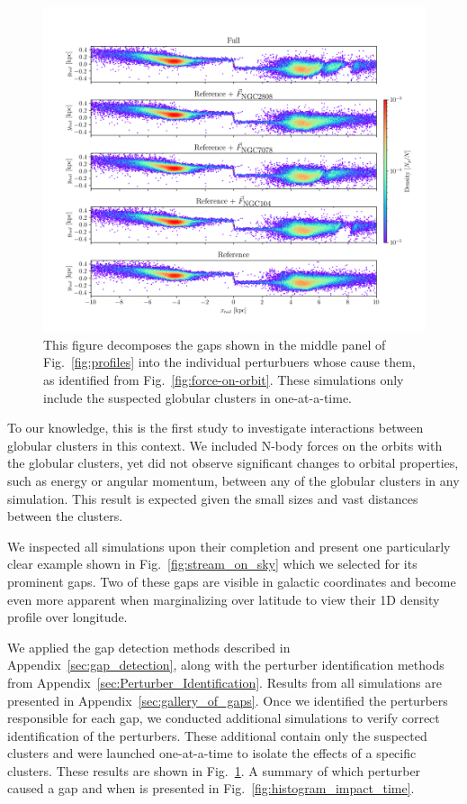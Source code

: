 \documentclass[draft]{aa}
\begin{document}
    \begin{figure}
      \centering
      \includegraphics[width=\linewidth]{decomposition-monte-carlo-009-with-3-gaps.png}
      \caption{This figure decomposes the gaps shown in the middle panel of Fig.~\ref{fig:profiles} into the individual perturbuers whose cause them, as identified from Fig.~\ref{fig:force-on-orbit}. These simulations only include the suspected globular clusters in one-at-a-time.}
      \label{fig:decomposition}
    \end{figure} 

    To our knowledge, this is the first study to investigate interactions between globular clusters in this context. We included N-body forces on the orbits with the globular clusters, yet did not observe significant changes to orbital properties, such as energy or angular momentum, between any of the globular clusters in any simulation. This result is expected given the small sizes and vast distances between the clusters.

    We inspected all simulations upon their completion and present one particularly clear example shown in Fig.~\ref{fig:stream_on_sky} which we selected for its prominent gaps. Two of these gaps are visible in galactic coordinates and become even more apparent when marginalizing over latitude to view their 1D density profile over longitude.
    

    We applied the gap detection methods described in Appendix~\ref{sec:gap_detection}, along with the perturber identification methods from Appendix~\ref{sec:Perturber_Identification}. Results from all simulations are presented in Appendix~\ref{sec:gallery_of_gaps}. Once we identified the perturbers responsible for each gap, we conducted additional simulations to verify correct identification of the perturbers. These additional contain only the suspected clusters and were launched one-at-a-time to isolate the effects of a specific clusters. These results are shown in Fig.~\ref{fig:decomposition}. A summary of which perturber caused a gap and when is presented in Fig.~\ref{fig:histogram_impact_time}. 
\end{document}
